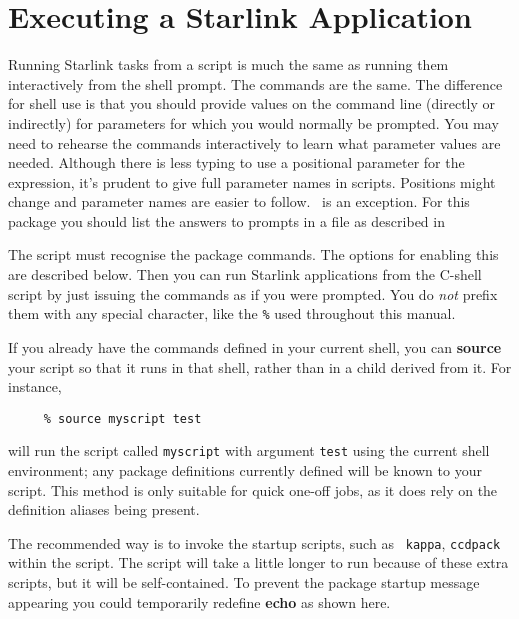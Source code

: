 \newpage
\section{Executing a Starlink Application
\label{sc4_se_starlink_app}}

Running Starlink tasks from a script is much the same as running them
interactively from the shell prompt.  The commands are the same.  The
difference for shell use is that you should provide values on the
command line (directly or indirectly) for parameters for which you
would normally be prompted.  You may need to rehearse the commands
interactively to learn what parameter values are needed.
Although there is less typing to use a positional parameter for the
expression, it's prudent to give full parameter names in scripts.
Positions might change and parameter names are easier to follow.
\CURSAref\ is an exception.  For this package you should list the
answers to prompts in a file as described in

The script must recognise the package commands.  The options for
enabling this are described below.  Then you can run Starlink
applications from the C-shell script by just issuing the commands as if
you were prompted.  You do {\em not} prefix them with any special
character, like the {\tt \%} used throughout this manual.

If you already have the commands defined in your current shell, you
can {\bf source} your script so that it runs in that shell, rather than
in a child  derived from it.  For instance,

\small
\begin{verbatim}
     % source myscript test
\end{verbatim}
\normalsize
will run the script called {\tt myscript} with argument {\tt test} using
the current shell environment; any package definitions currently
defined will be known to your script.  This method is only suitable
for quick one-off jobs, as it does rely on the definition aliases being
present.

The recommended way is to invoke the startup scripts, such as {\tt
kappa}, {\tt ccdpack} within the script.  The script will take a
little longer to run because of these extra scripts, but it will be
self-contained.  To prevent the package startup message appearing you
could temporarily redefine {\bf echo} as shown here.

